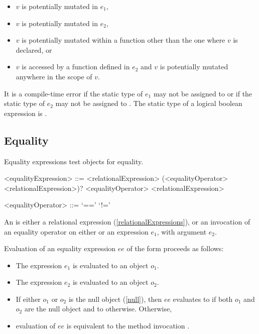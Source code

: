 \documentclass[makeidx]{article}
\begin{document}
{\begin{itemize}
\item $v$ is potentially mutated in $e_1$,
\item $v$ is potentially mutated in $e_2$,
\item $v$ is potentially mutated within a function other
  than the one where $v$ is declared, or
\item $v$ is accessed by a function defined in $e_2$ and
  $v$ is potentially mutated anywhere in the scope of $v$.
\end{itemize}

\LMHash{}%
It is a compile-time error if
the static type of $e_1$ may not be assigned to 
or if the static type of $e_2$ may not be assigned to .
The static type of a logical boolean expression is .


\subsection{Equality}

\LMHash{}%
Equality expressions test objects for equality.

\begin{grammar}
<equalityExpression> ::= \gnewline{}
  <relationalExpression> (<equalityOperator> <relationalExpression>)?
  \alt \SUPER{} <equalityOperator> <relationalExpression>

<equalityOperator> ::= `=='
  \alt `!='
\end{grammar}

\LMHash{}%
An  is either a relational expression
(\ref{relationalExpressions}),
or an invocation of an equality operator on either \SUPER{}
or an expression $e_1$, with argument $e_2$.

\LMHash{}%
Evaluation of an equality expression $ee$ of the form 
proceeds as follows:

\begin{itemize}
\item The expression $e_1$ is evaluated to an object $o_1$.
\item The expression $e_2$ is evaluated to an object $o_2$.
\item If either $o_1$ or $o_2$ is the null object (\ref{null}),
  then $ee$ evaluates to \TRUE{} if both $o_1$ and $o_2$ are the null object
  and to \FALSE{} otherwise.
Otherwise,
\item evaluation of $ee$ is equivalent to the method invocation
  .
\end{itemize}

}
\end{document}
